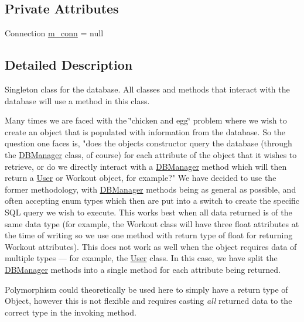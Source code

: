 \subsection*{Private Attributes}
\begin{DoxyCompactItemize}
\item 
Connection \mbox{\hyperlink{classcom_1_1activitytracker_1_1_d_b_manager_a064088d13ac09eb147fdc19268771521}{m\+\_\+conn}} = null
\end{DoxyCompactItemize}


\subsection{Detailed Description}
Singleton class for the database. All classes and methods that interact with the database will use a method in this class.

Many times we are faced with the \char`\"{}chicken and egg\char`\"{} problem where we wish to create an object that is populated with information from the database. So the question one faces is, "does the object\textquotesingle{}s constructor query the database (through the \mbox{\hyperlink{classcom_1_1activitytracker_1_1_d_b_manager}{D\+B\+Manager}} class, of course) for each attribute of the object that it wishes to retrieve, or do we directly interact with a \mbox{\hyperlink{classcom_1_1activitytracker_1_1_d_b_manager}{D\+B\+Manager}} method which will then return a \mbox{\hyperlink{classcom_1_1activitytracker_1_1_user}{User}} or Workout object, for example?" We have decided to use the former methodology, with \mbox{\hyperlink{classcom_1_1activitytracker_1_1_d_b_manager}{D\+B\+Manager}} methods being as general as possible, and often accepting enum types which then are put into a switch to create the specific S\+QL query we wish to execute. This works best when all data returned is of the same data type (for example, the Workout class will have three float attributes at the time of writing so we use one method with return type of float for returning Workout attributes). This does not work as well when the object requires data of multiple types --- for example, the \mbox{\hyperlink{classcom_1_1activitytracker_1_1_user}{User}} class. In this case, we have split the \mbox{\hyperlink{classcom_1_1activitytracker_1_1_d_b_manager}{D\+B\+Manager}} methods into a single method for each attribute being returned.

Polymorphism could theoretically be used here to simply have a return type of Object, however this is not flexible and requires casting {\itshape all} returned data to the correct type in the invoking method. 


